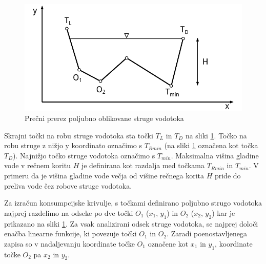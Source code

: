 \begin{figure}[ht!]
	\begin{centering}
		\includegraphics{slike/customChannel/customStruga.pdf}		
		\caption{Prečni prerez poljubno oblikovane struge vodotoka}\label{fig:poljubnaStruga}
	\end{centering}
\end{figure}



Skrajni točki na robu struge vodotoka sta točki $T_L$ in $T_D$ na sliki \ref{fig:poljubnaStruga}. Točko na robu struge z nižjo y koordinato označimo s $T_{Rmin}$ (na sliki \ref{fig:poljubnaStruga} označena kot točka $T_D$). Najnižjo točko struge vodotoka označimo s $T_{min}$. Maksimalna višina gladine vode v rečnem koritu $H$ je definirana kot razdalja med točkama $T_{Rmin}$ in $T_{min}$. V primeru da je višina gladine vode večja od višine rečnega korita $H$ pride do preliva vode čez robove struge vodotoka.



Za izračun konsumpcijske krivulje, s točkami definirano poljubno strugo vodotoka najprej razdelimo na odseke po dve točki $O_1$ ($x_1$, $y_1$) in $O_2$ ($x_2$, $y_2$) kar je prikazano na sliki \ref{fig:poljubnaStruga}. Za vsak analizirani odsek struge vodotoka, se najprej določi enačba linearne funkcije, ki povezuje točki $O_1$ in $O_2$.  Zaradi poenostavljenega zapisa so v nadaljevanju koordinate točke $O_1$ označene kot $x_1$ in $y_1$, koordinate točke $O_2$ pa $x_2$ in $y_2$.


